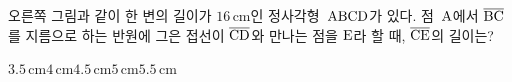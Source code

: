 \noindent\begin{minipage}[t]{0.58\linewidth}\vspace{0pt}\raggedright 오른쪽 그림과 같이 한 변의 길이가 $16\,\mathrm{cm}$인 정사각형~$\mathrm{ABCD}$가 있다. 점~$\mathrm{A}$에서 $\overline{\mathrm{BC}}$를 지름으로 하는 반원에 그은 접선이 $\overline{\mathrm{CD}}$와 만나는 점을 $\mathrm{E}$라 할 때, $\overline{\mathrm{CE}}$의 길이는?\end{minipage}\hfill\begin{minipage}[t]{0.4\linewidth}\vspace{0pt}\centering \resizebox{\ifdim\width>\linewidth\linewidth\else\width\fi}{!}{}\end{minipage}\par
\begin{choices32}{$3.5\,\mathrm{cm}$}{$4\,\mathrm{cm}$}{$4.5\,\mathrm{cm}$}{$5\,\mathrm{cm}$}{$5.5\,\mathrm{cm}$}\end{choices32}
